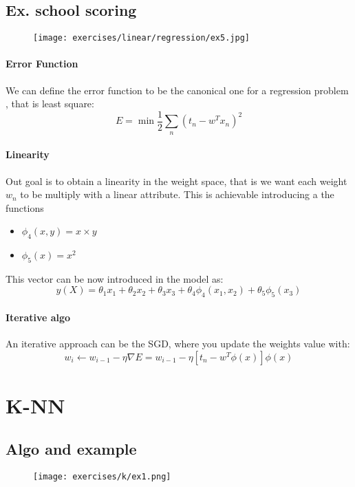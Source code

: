 \subsection{Ex. school scoring}

\begin{figure}[H]
    \centering
    \texttt{[image: exercises/linear/regression/ex5.jpg]}
\end{figure}

\paragraph{Error Function }
We can define the error function to be the canonical one for a regression problem , that is least square:
$$E=\min\frac{1}{2}\sum_n (t_n -w^Tx_n)^2$$

\paragraph{Linearity}
Out goal is to obtain a linearity in the weight space, that is we want each weight $w_n$ to be multiply with a linear attribute. This is achievable introducing a the functions
\begin{itemize}
\item $\phi_4(x,y)=x\times y$
\item $\phi_5(x)=x^2$
\end{itemize}
This vector can be now introduced in the model as:
$$y(X)=\theta_1 x_1+ \theta_2 x_2+\theta_3 x_3+ \theta_4 \phi_4(x_1,x_2)+\theta_5\phi_5(x_3)$$

\paragraph{Iterative algo}
An iterative approach can be the SGD, where you update the weights value with:
$$w_i \leftarrow w_{i-1} - \eta\nabla E=w_{i-1} - \eta[t_n-w^T\phi(x)]\phi(x)$$



\section{K-NN}

\subsection{Algo and example}

\begin{figure}[H]
    \centering
    \texttt{[image: exercises/k/ex1.png]}
\end{figure}

